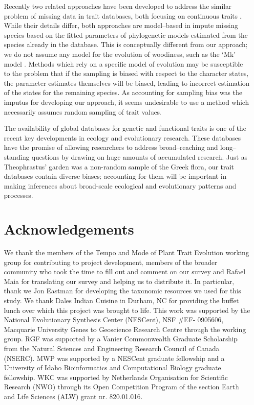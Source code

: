 \documentclass[a4paper,12pt]{article}
\begin{document}
Recently two related approaches have been developed to address the similar problem
of missing data in trait databases, both focusing on continuous traits \citep{Swenson2013, PEM}. 
While their details differ, both approaches are model--based in impute missing species
based on the fitted parameters of
phylogenetic models estimated from
the species already in the database. This is conceptually different from our approach;
we do not assume any model for the evolution of woodiness, such as the `Mk' model \citep{Pagel1994}.
Methods which rely on a specific model
of evolution may be susceptible to the problem that if the sampling is biased with respect
to the character states, the parameter estimates themselves will be biased, leading 
to incorrect estimation of the states for the remaining species. As accounting for sampling bias
was the imputus for developing our approach, it seems undesirable to use
a method which necessarily assumes random sampling of trait values.

The availability of global databases for genetic and functional traits is one of the recent key developments in ecology and evolutionary research.  These databases have the promise of allowing researchers to address broad--reaching and long--standing questions by drawing on huge amounts of accumulated research.  
Just as Theophrastus' garden was a non-random sample of the Greek
flora, our trait databases contain diverse biases; accounting for
them will be important in making inferences about broad-scale
ecological and evolutionary patterns and processes.

\section{Acknowledgements}

We thank the members of the Tempo and Mode of Plant Trait
Evolution working group for contributing to project development,
members of the broader community who took the time to fill out and
comment on our survey and Rafael Maia for translating our survey and
helping us to distribute it.  In particular, thank we Jon Eastman for 
developing the taxonomic resources we used for this study.
%
We thank Dales Indian Cuisine in Durham, NC for providing the buffet
lunch over which this project was brought to life.
%
This work was supported by the National Evolutionary Synthesis Center
(NESCent), NSF \#EF- 0905606, Macquarie University Genes to Geoscience
Research Centre through the working group.
%
RGF was supported by a Vanier Commonwealth Graduate Scholarship from
the Natural Sciences and Engineering Research Council of Canada
(NSERC).
MWP was supported by a NESCent graduate fellowship and a 
University of Idaho Bioinformatics and Computational Biology graduate fellowship.
%
WKC was supported by Netherlands Organisation for
Scientific Research (NWO) through its Open Competition Program of the
section Earth and Life Sciences (ALW) grant nr. 820.01.016.
\end{document}
